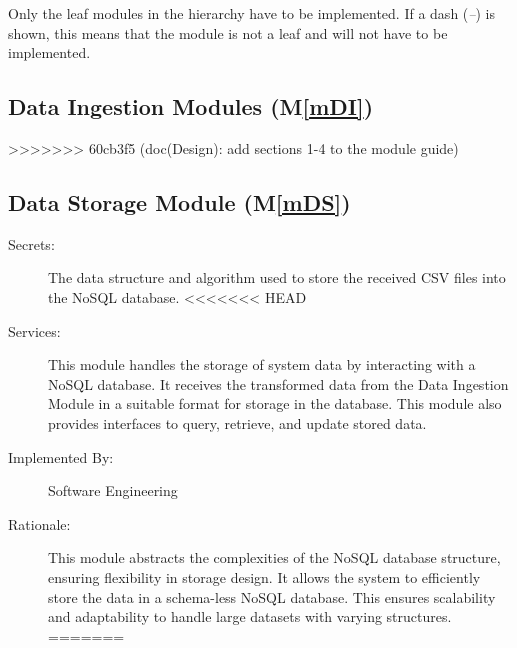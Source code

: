 \documentclass[12pt, titlepage]{article}
\newcommand{\mref}[1]{M\ref{#1}}
\begin{document}
Only the leaf modules in the hierarchy have to be implemented. If a dash
(\emph{--}) is shown, this means that the module is not a leaf and will not have
to be implemented.

\subsection{Data Ingestion Modules (\mref{mDI})}
>>>>>>> 60cb3f5 (doc(Design): add sections 1-4 to the module guide)

\subsection{Data Storage Module (\mref{mDS})}
\begin{description}
  \item[Secrets:] The data structure and algorithm used to store the received CSV files into the
  NoSQL database.
<<<<<<< HEAD
  \item[Services:] This module handles the storage of system data by interacting with
  a NoSQL database. It receives the transformed data from the Data Ingestion Module in a suitable
  format for storage in the database. This module also provides interfaces to query, retrieve, and
  update stored data.
  \item[Implemented By:] Software Engineering
  \item[Rationale:] This module abstracts the complexities of the NoSQL database
  structure, ensuring flexibility in storage design. It allows the system to 
  efficiently store the data in a schema-less NoSQL database. This ensures scalability and 
  adaptability to handle large datasets with varying structures.
=======


\end{description}
\end{document}

